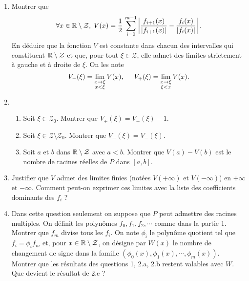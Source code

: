 \begin{enumerate}
  \item Montrer que 
\[
  \forall x \in \mathbb{R} \setminus \mathcal{Z}, \; V(x) = 
  \frac{1}{2}\,\sum_{i=0}^{m-1} \left|\frac{f_{i+1}(x)}{\left| f_{i+1}(x)\right|} - \frac{f_{i}(x)}{\left| f_{i}(x)\right|} \right| .
\]
En déduire que la fonction $V$ est constante dans chacun des intervalles qui constituent $\mathbb{R} \setminus \mathcal{Z}$ et que,
pour tout $\xi \in \mathcal{Z}$, elle admet des limites strictement à gauche et à droite de $\xi$. On les note 
\[
V_-(\xi) = \lim_{\substack{x \rightarrow \xi \\ x < \xi}} V(x), \hspace{0.5cm}
V_+(\xi) = \lim_{\substack{x \rightarrow \xi \\ \xi < x}} V(x).
\]

 \item 
 \begin{enumerate}
   \item Soit $\xi \in \mathcal{Z}_0$. Montrer que $V_+(\xi) = V_-(\xi) -1$.
   \item Soit $\xi \in \mathcal{Z} \setminus \mathcal{Z}_0$. Montrer que $V_+(\xi) = V_-(\xi)$.
   \item Soit $a$ et $b$ dans $\mathbb{R} \setminus \mathcal{Z}$ avec $a < b$. Montrer que $V(a) - V(b)$ est le nombre de racines réelles de $P$ dans $[a,b]$. 
 \end{enumerate}
 
 \item Justifier que $V$ admet des limites finies (notées $V(+\infty)$ et $V(-\infty)$) en $+\infty$ et $-\infty$. Comment peut-on exprimer ces limites avec la liste des coefficients dominants des $f_i$ ?
 
 \item Dans cette question seulement on suppose que $P$ peut admettre des racines multiples. On définit les polynômes $f_0, f_1,f_2, \cdots$ comme dans la partie 1.\newline 
 Montrer que $f_m$ divise tous les $f_i$.\newline
   On note $\phi_i$ le polynôme quotient tel que $f_i = \phi_i f_m $ et, pour $x \in \mathbb{R} \setminus \mathcal{Z}$, on désigne par $W(x)$ le nombre de changement de signe dans la famille
$\left(\phi_0(x), \phi_1(x), \cdots, \phi_m(x) \right)$.\newline
Montrer que les résultats des questions 1, 2.a, 2.b restent valables avec $W$. Que devient le résultat de 2.c ?
\end{enumerate}

